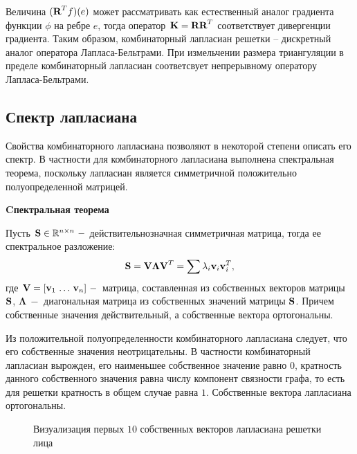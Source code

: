 Величина $(\textbf{R}^T f)(e)$ может рассматривать как естественный аналог градиента функции $\phi$ на ребре $e$, тогда оператор $\textbf{K} = \textbf{R} \textbf{R}^T $ соответствует дивергенции градиента. Таким образом, комбинаторный лапласиан решетки -- дискретный аналог оператора Лапласа-Бельтрами. При измельчении размера триангуляции в пределе комбинаторный лапласиан соответсвует непрерывному оператору Лапласа-Бельтрами.

\subsection{Спектр лапласиана}

Свойства комбинаторного лапласиана позволяют в некоторой степени описать его спектр. В частности для комбинаторного лапласиана выполнена спектральная теорема, поскольку лапласиан является симметричной положительно полуопределенной матрицей. \medskip

\textbf{Cпектральная теорема}

Пусть $\textbf{S} \in \mathbb{R}^{n \times n} ~- $ действительнозначная симметричная матрица, тогда ее спектральное разложение:
$$\textbf{S} = \textbf{V}  \bm{\Lambda} \textbf{V}^T = \sum \lambda_i \textbf{v}_i \textbf{v}_i^T,$$ 
где $\textbf{V} = [\textbf{v}_1 \, \dots \, \textbf{v}_n] ~- $  матрица, составленная из собственных векторов матрицы $\textbf{S}$, $ \bm{\Lambda} ~-$ диагональная матрица из собственных значений матрицы $\textbf{S}$. Причем собственные значения действительный, а собственные вектора ортогональны.

Из положительной полуопределенности комбинаторного лапласиана следует, что его собственные значения неотрицательны. В частности комбинаторный лапласиан вырожден, его наименьшее собственное значение равно $0$, кратность данного собственного значения равна числу компонент связности графа, то есть для решетки кратность в общем случае равна $1$. Собственные вектора лапласиана ортогональны.

\begin{figure}[!htb]
\caption{Визуализация первых $10$ собственных векторов лапласиана решетки лица}
\end{figure}

